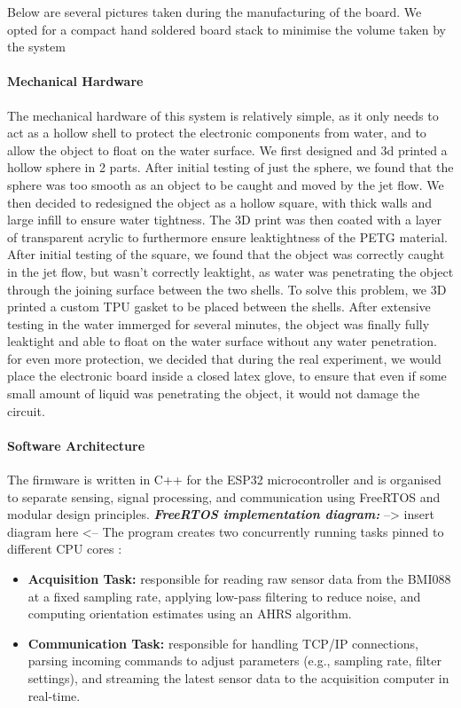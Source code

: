 \documentclass[10pt, a4paper, twocolumn]{article}
\begin{document}
Below are several pictures taken during the manufacturing of the board. We opted for a compact hand soldered board stack to minimise the volume taken by the system



\paragraph{Mechanical Hardware}
The mechanical hardware of this system is relatively simple, as it only needs to act as a hollow shell to protect the electronic components from water, and to allow the object to float on the water surface. We first designed and 3d printed a hollow sphere in 2 parts. After initial testing of just the sphere, we found that the sphere was too smooth as an object to be caught and moved by the jet flow. We then decided to redesigned the object as a hollow square, with thick walls and large infill to ensure water tightness. The 3D print was then coated with a layer of transparent acrylic to furthermore ensure leaktightness of the PETG material.
After initial testing of the square, we found that the object was correctly caught in the jet flow, but wasn't correctly leaktight, as water was penetrating the object through the joining surface between the two shells. To solve this problem, we 3D printed a custom TPU gasket to be placed between the shells. After extensive testing in the water immerged for several minutes, the object was finally fully leaktight and able to float on the water surface without any water penetration.
for even more protection, we decided that during the real experiment, we would place the electronic board inside a closed latex glove, to ensure that even if some small amount of liquid was penetrating the object, it would not damage the circuit.


\paragraph{Software Architecture}
The firmware is written in C++ for the ESP32 microcontroller and is organised to separate sensing, signal processing, and communication using FreeRTOS and modular design principles.
\newline
\textbf{\emph{FreeRTOS implementation diagram:}}
\newline
--> insert diagram here <--
\newline
The program creates two concurrently running tasks pinned to different CPU cores : 
\begin{itemize}
    \item \textbf{Acquisition Task:} responsible for reading raw sensor data from the BMI088 at a fixed sampling rate, applying low-pass filtering to reduce noise, and computing orientation estimates using an AHRS algorithm.
    \item \textbf{Communication Task:} responsible for handling TCP/IP connections, parsing incoming commands to adjust parameters (e.g., sampling rate, filter settings), and streaming the latest sensor data to the acquisition computer in real-time.
\end{itemize}
\end{document}
